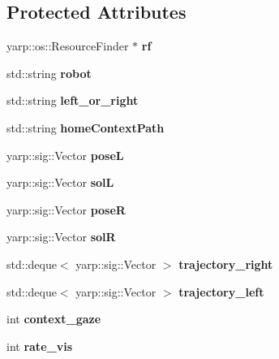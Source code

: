 \subsection*{Protected Attributes}
\begin{DoxyCompactItemize}
\item 
yarp\+::os\+::\+Resource\+Finder $\ast$ {\bfseries rf}\label{classGraspingModule_aed592146c8031a537a8d1f71a7e054c5}

\item 
std\+::string {\bfseries robot}\label{classGraspingModule_a508cc33e7003b294f00316f362f82eaa}

\item 
std\+::string {\bfseries left\+\_\+or\+\_\+right}\label{classGraspingModule_ab9603885e438ebe5a7f673c04bc37ed8}

\item 
std\+::string {\bfseries home\+Context\+Path}\label{classGraspingModule_a0aa116f84336b88479b6f3ac6a97e76b}

\item 
yarp\+::sig\+::\+Vector {\bfseries poseL}\label{classGraspingModule_ae819bea3ec49cbec2703737a7a786007}

\item 
yarp\+::sig\+::\+Vector {\bfseries solL}\label{classGraspingModule_a0a13dee5ac1b2db61a87f82ecdc44ea6}

\item 
yarp\+::sig\+::\+Vector {\bfseries poseR}\label{classGraspingModule_a148c46809e3dba05972df158c81c48f8}

\item 
yarp\+::sig\+::\+Vector {\bfseries solR}\label{classGraspingModule_a1215352771f0e7f26e033ad95731a81e}

\item 
std\+::deque$<$ yarp\+::sig\+::\+Vector $>$ {\bfseries trajectory\+\_\+right}\label{classGraspingModule_ac7c1f1dc2e81ed15f87218feaa038988}

\item 
std\+::deque$<$ yarp\+::sig\+::\+Vector $>$ {\bfseries trajectory\+\_\+left}\label{classGraspingModule_afcfe41fdc6ce4446e89594a3d40d2a7d}

\item 
int {\bfseries context\+\_\+gaze}\label{classGraspingModule_ab87532f4790da036cdf51654a649cece}

\item 
int {\bfseries rate\+\_\+vis}\label{classGraspingModule_a26e3aee1196f9b3783426f5be6a387b5}


\end{DoxyCompactItemize}
